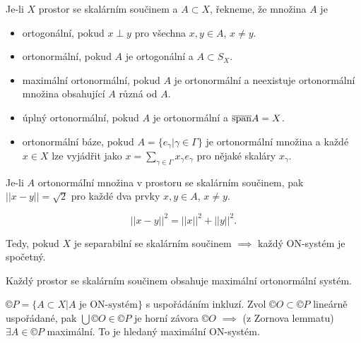 \documentclass[12pt]{article}					%
\begin{document}
\begin{definice}
	Je-li $X$ prostor se skalárním součinem a $A \subset X$, řekneme, že množina $A$ je

	\begin{itemize}
		\item ortogonální, pokud $x \perp y$ pro všechna $x, y \in A$, $x ≠ y$.
		\item ortonormální, pokud $A$ je ortogonální a $A \subset S_X$.
		\item maximální ortonormální, pokud $A$ je ortonormální a neexistuje ortonormální množina obsahující $A$ různá od $A$.
		\item úplný ortonormální, pokud $A$ je ortonormální a $\overline{\operatorname{span}} A = X$.
		\item ortonormální báze, pokud $A = \{e_\gamma | \gamma \in \Gamma\}$ je ortonormální množina a každé $x \in X$ lze vyjádřit jako $x = \sum_{\gamma \in \Gamma}x_\gamma e_\gamma$ pro nějaké skaláry $x_\gamma$.
	\end{itemize}
\end{definice}

\begin{tvrzeni}[Fakt]
	Je-li $A$ ortonormáľní množina v prostoru se skalárním součinem, pak $||x - y|| = \sqrt{2}$ pro každé dva prvky $x, y \in A$, $x ≠ y$.

	\begin{dukazin}
		$$ ||x - y||^2 = ||x||^2 + ||y||^2. $$
	\end{dukazin}

	\begin{poznamkain}
		Tedy, pokud $X$ je separabilní se skalárním součinem $\implies$ každý ON-systém je spočetný.
	\end{poznamkain}
\end{tvrzeni}

\begin{veta}
	Každý prostor se skalárním součinem obsahuje maximální ortonormální systém.

	\begin{dukazin}
		$©P = \{A \subset X | A \text{ je ON-systém}\}$ s uspořádáním inkluzí. Zvol $©O \subset ©P$ lineárně uspořádané, pak $\bigcup ©O \in ©P$ je horní závora $©O$ $\implies$ (z Zornova lemmatu) $\exists A \in ©P$ maximální. To je hledaný maximální ON-systém.
	\end{dukazin}
\end{veta}
\end{document}
